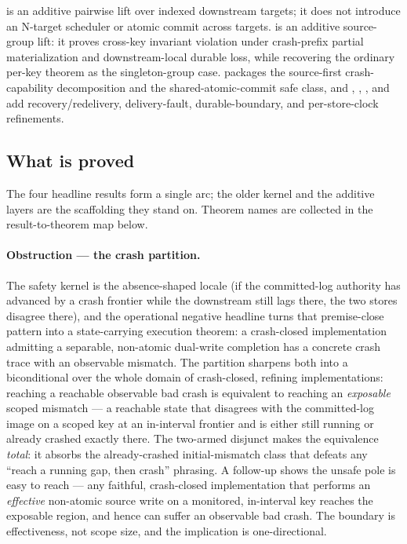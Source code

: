 \documentclass[11pt,a4paper]{article}
\begin{document}
 is an additive
pairwise lift over indexed downstream targets; it does not introduce an
N-target scheduler or atomic commit across targets.
 is an additive
source-group lift: it proves cross-key invariant violation under crash-prefix
partial materialization and downstream-local durable loss, while recovering the
ordinary per-key theorem as the singleton-group case.
 packages the
source-first crash-capability decomposition and the shared-atomic-commit safe
class, and
,
,
, and
 add
recovery/redelivery, delivery-fault, durable-boundary, and per-store-clock
refinements.

\subsection*{What is proved}

The four headline results form a single arc; the older kernel and the additive
layers are the scaffolding they stand on. Theorem names are collected in the
result-to-theorem map below.

\paragraph{Obstruction --- the crash partition.} The safety kernel is the
absence-shaped  locale (if the
committed-log authority has advanced by a crash frontier while the downstream
still lags there, the two stores disagree there), and the operational negative
headline turns that premise-close pattern into a state-carrying execution
theorem: a crash-closed implementation admitting a separable, non-atomic
dual-write completion has a concrete crash trace with an observable mismatch.
The partition sharpens both into a biconditional over the whole domain of
crash-closed, refining implementations: reaching a reachable observable bad crash
is equivalent to reaching an \emph{exposable} scoped mismatch --- a reachable
state that disagrees with the committed-log image on a scoped key at an
in-interval frontier and is either still running or already crashed exactly
there. The two-armed disjunct makes the equivalence \emph{total}: it absorbs the
already-crashed initial-mismatch class that defeats any ``reach a running gap,
then crash'' phrasing. A follow-up shows the unsafe pole is easy to reach --- any
faithful, crash-closed implementation that performs an \emph{effective}
non-atomic source write on a monitored, in-interval key reaches the exposable
region, and hence can suffer an observable bad crash. The boundary is
effectiveness, not scope size, and the implication is one-directional.
\end{document}
